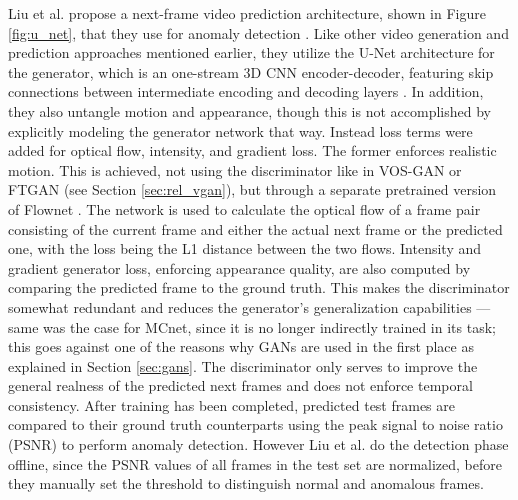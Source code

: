 Liu et al. propose a next-frame video prediction architecture, shown in Figure \ref{fig:u_net}, that they use for anomaly detection \cite{liu2018future}. Like other video generation and prediction approaches mentioned earlier, they utilize the U-Net architecture for the generator, which is an one-stream 3D CNN encoder-decoder, featuring skip connections between intermediate encoding and decoding layers \cite{ronneberger2015u}. In addition, they also untangle motion and appearance, though this is not accomplished by explicitly modeling the generator network that way. Instead loss terms were added for optical flow, intensity, and gradient loss. The former enforces realistic motion. This is achieved, not using the discriminator like in VOS-GAN or FTGAN (see Section \ref{sec:rel_vgan}), but through a separate pretrained version of Flownet \cite{dosovitskiy2015flownet}. The network is used to calculate the optical flow of a frame pair consisting of the current frame and either the actual next frame or the predicted one, with the loss being the L1 distance between the two flows. Intensity and gradient generator loss, enforcing appearance quality, are also computed by comparing the predicted frame to the ground truth. This makes the discriminator somewhat redundant and reduces the generator's generalization capabilities --- same was the case for MCnet, since it is no longer indirectly trained in its task; this goes against one of the reasons why GANs are used in the first place as explained in Section \ref{sec:gans}. The discriminator only serves to improve the general realness of the predicted next frames and does not enforce temporal consistency. After training has been completed, predicted test frames are compared to their ground truth counterparts using the peak signal to noise ratio (PSNR) to perform anomaly detection. However Liu et al. do the detection phase offline, since the PSNR values of all frames in the test set are normalized, before they manually set the threshold to distinguish normal and anomalous frames.

